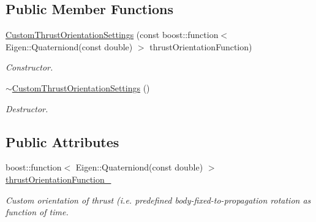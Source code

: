 \subsection*{Public Member Functions}
\begin{DoxyCompactItemize}
\item 
\hyperlink{classtudat_1_1simulation__setup_1_1CustomThrustOrientationSettings_a18ff287ba66234504e3b3017fc5404c1}{Custom\+Thrust\+Orientation\+Settings} (const boost\+::function$<$ Eigen\+::\+Quaterniond(const double) $>$ thrust\+Orientation\+Function)
\begin{DoxyCompactList}\small\item\em Constructor. \end{DoxyCompactList}\item 
\hyperlink{classtudat_1_1simulation__setup_1_1CustomThrustOrientationSettings_acb735777a250d8d98c08c669f2868af3}{$\sim$\+Custom\+Thrust\+Orientation\+Settings} ()\hypertarget{classtudat_1_1simulation__setup_1_1CustomThrustOrientationSettings_acb735777a250d8d98c08c669f2868af3}{}\label{classtudat_1_1simulation__setup_1_1CustomThrustOrientationSettings_acb735777a250d8d98c08c669f2868af3}

\begin{DoxyCompactList}\small\item\em Destructor. \end{DoxyCompactList}\end{DoxyCompactItemize}
\subsection*{Public Attributes}
\begin{DoxyCompactItemize}
\item 
boost\+::function$<$ Eigen\+::\+Quaterniond(const double) $>$ \hyperlink{classtudat_1_1simulation__setup_1_1CustomThrustOrientationSettings_a1c75f9a9be9a9ff01097b38ebbed72f1}{thrust\+Orientation\+Function\+\_\+}\hypertarget{classtudat_1_1simulation__setup_1_1CustomThrustOrientationSettings_a1c75f9a9be9a9ff01097b38ebbed72f1}{}\label{classtudat_1_1simulation__setup_1_1CustomThrustOrientationSettings_a1c75f9a9be9a9ff01097b38ebbed72f1}

\begin{DoxyCompactList}\small\item\em Custom orientation of thrust (i.\+e. predefined body-\/fixed-\/to-\/propagation rotation as function of time. \end{DoxyCompactList}\end{DoxyCompactItemize}


